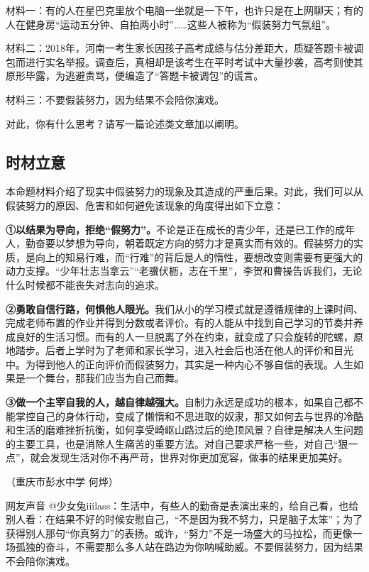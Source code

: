 材料一：有的人在星巴克里放个电脑一坐就是一下午，也许只是在上网聊天；有的人在健身房“运动五分钟、自拍两小时”……这些人被称为“假装努力气氛组”。

材料二：2018年，河南一考生家长因孩子高考成绩与估分差距大，质疑答题卡被调包而进行实名举报。调查后，真相却是该考生在平时考试中大量抄袭，高考则使其原形毕露，为逃避责骂，便编造了“答题卡被调包”的谎言。

材料三：不要假装努力，因为结果不会陪你演戏。

对此，你有什么思考？请写一篇论述类文章加以阐明。

\subsection*{时材立意}

本命题材料介绍了现实中假装努力的现象及其造成的严重后果。对此，我们可以从假装努力的原因、危害和如何避免该现象的角度得出如下立意：

\textbf{①以结果为导向，拒绝“假努力”。}不论是正在成长的青少年，还是已工作的成年人，勤奋要以梦想为导向，朝着既定方向的努力才是真实而有效的。假装努力的实质，是向上的知易行难，而“行难”的背后是人的惰性，要想改变则需要有更强大的动力支撑。“少年壮志当拿云”“老骥伏枥，志在千里”，李贺和曹操告诉我们，无论什么时候都不能丧失对志向的追求。

\textbf{②勇敢自信行路，何惧他人眼光。}我们从小的学习模式就是遵循规律的上课时间、完成老师布置的作业并得到分数或者评价。有的人能从中找到自己学习的节奏并养成良好的生活习惯。而有的人一旦脱离了外在约束，就变成了只会旋转的陀螺，原地踏步。后者上学时为了老师和家长学习，进入社会后也活在他人的评价和目光中。为得到他人的正向评价而假装努力，其实是一种内心不够自信的表现。人生如果是一个舞台，那我们应当为自己而舞。

\textbf{③做一个主宰自我的人，越自律越强大。}自制力永远是成功的根本，如果自己都不能掌控自己的身体行动，变成了懒惰和不思进取的奴隶，那又如何去与世界的冷酷和生活的磨难挫折抗衡，如何享受崎岖山路过后的绝顶风景？自律是解决人生问题的主要工具，也是消除人生痛苦的重要方法。对自己要求严格一些，对自己“狠一点”，就会发现生活对你不再严苛，世界对你更加宽容，做事的结果更加美好。

（重庆市彭水中学 何烨）

\begin{quoteBox}{网友声音}
@少女兔iiilass：生活中，有些人的勤奋是表演出来的，给自己看，也给别人看：在结果不好的时候安慰自己，“不是因为我不努力，只是脑子太笨”；为了获得别人那句“你真努力”的表扬。或许，“努力”不是一场盛大的马拉松，而更像一场孤独的奋斗，不需要那么多人站在路边为你呐喊助威。不要假装努力，因为结果不会陪你演戏。
\end{quoteBox}


